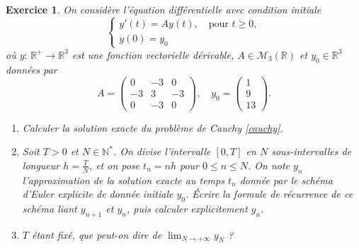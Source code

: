 \documentclass[11pt]{article}
\newcommand{\R}{\ensuremath{\mathbb R}}
\newcommand{\N}{\ensuremath{\mathbb N}}
\theoremstyle{exostyle}
\newtheorem{exercice}{Exercice}
\begin{document}
\newpage
\begin{exercice}
On considère l'équation différentielle avec condition initiale 
\begin{equation}
 \label{cauchy}
 \left\{
  \begin{array}{l}
     y'(t)= A y(t), \quad \textrm{pour } t\geq 0, \\
     y(0)=y_0
  \end{array}
\right.
\end{equation}
où $y : \, \R^+ \rightarrow \R^3$ est une fonction vectorielle dérivable, $A\in \mathcal{M}_3(\R)$ et $y_0\in \R^3$ données par 
$$ A=\begin{pmatrix} 0 & -3 & 0 \\  -3 & 3 & -3 \\ 0 & -3 & 0 \end{pmatrix},
\quad 
y_0 =\begin{pmatrix} 1 \\  9 \\ 13 \end{pmatrix}.$$
\begin{enumerate}
  \item Calculer la solution exacte du problème de Cauchy \eqref{cauchy}.
  \item Soit $T>0$ et $N\in \N^*$. On divise l'intervalle $[0,T]$ en $N$  sous-intervalles de longueur 
           $h=\frac{T}{N}$, et on pose $t_n=n h$ pour $0\leq n\leq N$. 
        On note $y_n$ l'approximation  de la solution exacte au temps $t_n$ donnée par le schéma d'Euler explicite de donnée initiale $y_0$.
       \'Ecrire la formule de récurrence de ce schéma liant $y_{n+1}$ et $y_n$, puis calculer explicitement $y_n$.
 \item $T$ étant fixé, que peut-on dire de $\lim_{N\to +\infty} y_N$ ?
\end{enumerate} 
\end{exercice}
\medskip
\end{document}
